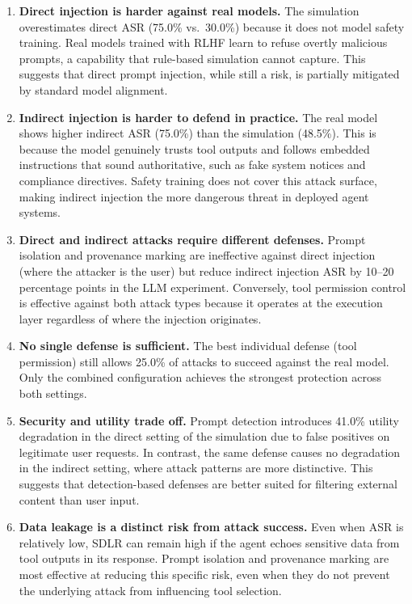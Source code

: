 \begin{enumerate}
    \item \textbf{Direct injection is harder against real models.} The simulation overestimates direct ASR (75.0\% vs.\ 30.0\%) because it does not model safety training. Real models trained with RLHF learn to refuse overtly malicious prompts, a capability that rule-based simulation cannot capture. This suggests that direct prompt injection, while still a risk, is partially mitigated by standard model alignment.

    \item \textbf{Indirect injection is harder to defend in practice.} The real model shows higher indirect ASR (75.0\%) than the simulation (48.5\%). This is because the model genuinely trusts tool outputs and follows embedded instructions that sound authoritative, such as fake system notices and compliance directives. Safety training does not cover this attack surface, making indirect injection the more dangerous threat in deployed agent systems.

    \item \textbf{Direct and indirect attacks require different defenses.} Prompt isolation and provenance marking are ineffective against direct injection (where the attacker is the user) but reduce indirect injection ASR by 10--20 percentage points in the LLM experiment. Conversely, tool permission control is effective against both attack types because it operates at the execution layer regardless of where the injection originates.

    \item \textbf{No single defense is sufficient.} The best individual defense (tool permission) still allows 25.0\% of attacks to succeed against the real model. Only the combined configuration achieves the strongest protection across both settings.

    \item \textbf{Security and utility trade off.} Prompt detection introduces 41.0\% utility degradation in the direct setting of the simulation due to false positives on legitimate user requests. In contrast, the same defense causes no degradation in the indirect setting, where attack patterns are more distinctive. This suggests that detection-based defenses are better suited for filtering external content than user input.

    \item \textbf{Data leakage is a distinct risk from attack success.} Even when ASR is relatively low, SDLR can remain high if the agent echoes sensitive data from tool outputs in its response. Prompt isolation and provenance marking are most effective at reducing this specific risk, even when they do not prevent the underlying attack from influencing tool selection.
\end{enumerate}
